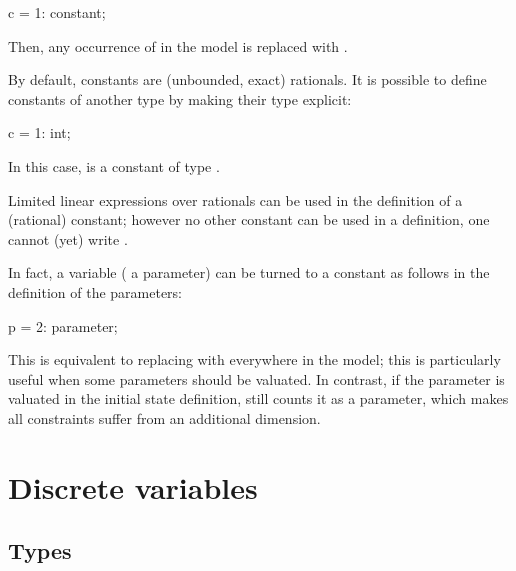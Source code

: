 \begin{IMITATORmodel}
c = 1: constant;
\end{IMITATORmodel}

Then, any occurrence of  in the model is replaced with .

By default, constants are (unbounded, exact) rationals.
It is possible to define constants of another type by making their type explicit:

\begin{IMITATORmodel}
c = 1: int;
\end{IMITATORmodel}

In this case,  is a constant of type .

Limited linear expressions over rationals can be used in the definition of a (rational) constant; however no other constant can be used in a definition, \ie{} one cannot (yet) write .


\begin{hint}
	In fact, a variable (\eg{} a parameter) can be turned to a constant as follows in the definition of the parameters:

\begin{IMITATORmodel}
p = 2: parameter;
\end{IMITATORmodel}

	This is equivalent to replacing  with  everywhere in the model; this is particularly useful when some parameters should be valuated.
	In contrast, if the parameter is valuated in the initial state definition, \imitator{} still counts it as a parameter, which makes all constraints suffer from an additional dimension.
\end{hint}





\section{Discrete variables}\label{section:discrete}


\subsection{Types}

